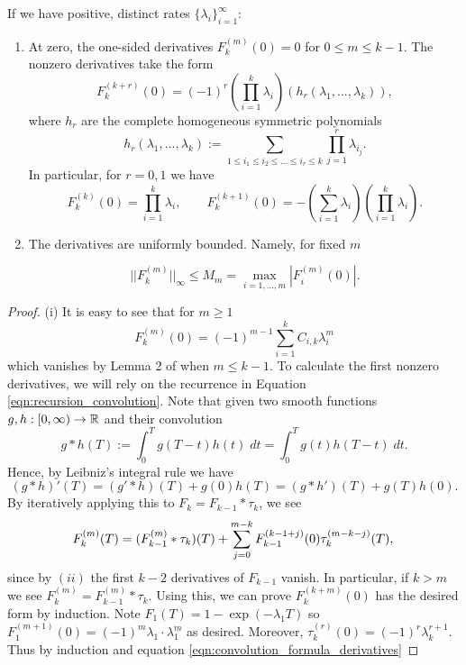 \begin{subappendices}
\begin{lemma}
\label{lem:hypoexponential_derivative_properties}
    If we have positive, distinct rates $\{\lambda_i\}_{i = 1}^\infty$:

    \begin{enumerate}[label=(\roman*)]
        \item At zero, the one-sided derivatives $F_k^{(m)}(0) = 0$ for $0 \leq m \leq k-1$. The nonzero derivatives take the form
        \[F_{k}^{{(k + r)}}(0) = (-1)^r \left(\prod_{i=1}^k \lambda_i\right) \left(h_r(\lambda_1,..., \lambda_k)\right),\]
        \noindent where $h_r$ are the complete homogeneous symmetric polynomials
        \[ h_r(\lambda_1, ..., \lambda_k) := \sum_{1\leq i_1\leq i_2 \leq ...\leq i_r\leq k} \prod_{j=1}^r \lambda_{i_j}.\]
        \noindent In particular, for $r=0, 1$ we have
            \[F_k^{(k)}(0) = \prod_{i=1}^k \lambda_i, \qquad F_k^{(k+1)}(0) = -\left(\sum_{i=1}^k \lambda_i\right)\left(\prod_{i=1}^k \lambda_i\right).\]
        \item The derivatives are uniformly bounded. Namely, for fixed $m$

        \[||F_k^{(m)}||_\infty \leq M_m = \max_{i=1, ...,m} |F_i^{(m)}(0)|.\]

    \end{enumerate}


\end{lemma}


\begin{proof}

\noindent (i) It is easy to see that for $m \geq 1$
%
\[F_k^{(m)}(0) = (-1)^{m-1}\sum_{i=1}^k C_{i,k} \lambda_i^m\]
%
which vanishes by Lemma 2 of \cite{yanev2020_exponential_hypoexponential_characterizations} when $m \leq k-1$. To calculate the first nonzero derivatives, we will rely on the recurrence in Equation \ref{eqn:recursion_convolution}. Note that given two smooth functions $g,h : [0, \infty) \to \mathbb{R}$ and their convolution
%
\[g \ast h(T) := \int_0^T g(T-t) h(t) \; dt = \int_0^T g(t) h(T-t) \; dt.\]
%
\noindent Hence, by Leibniz's integral rule we have
%
\begin{equation}
    (g \ast h)'(T) = (g' \ast h)(T) + g(0)h(T) = (g \ast h')(T) + g(T)h(0).
    \label{eqn:derivatives_of_convolutions}
\end{equation}
%
\noindent By iteratively applying this to $F_k = F_{k-1} \ast \tau_k$, we see
%
\begin{equation}
F_k^{(m)}(T) = (F_{k-1}^{(m)} \ast \tau_k)(T) + \sum_{j=0}^{m-k} F_{k-1}^{(k-1+j)}(0) \tau^{(m-k-j)}_k(T),\\
\label{eqn:convolution_formula_derivatives}
\end{equation}
%
\noindent since by $(ii)$ the first $k-2$ derivatives of $F_{k-1}$ vanish. In particular, if $k > m$ we see $F_k^{(m)} = F^{(m)}_{k-1} \ast \tau_k$. Using this, we can prove $F_{k}^{(k+m)}(0)$ has the desired form by induction. Note $F_1(T) = 1-\exp(-\lambda_1 T)$ so $F_1^{(m+1)}(0) = (-1)^{m}\lambda_1 \cdot \lambda_1^m$ as desired. Moreover, $\tau_k^{(r)}(0) = (-1)^r \lambda_k^{r+1}$. Thus by induction and equation \eqref{eqn:convolution_formula_derivatives}


\end{proof}
\end{subappendices}
